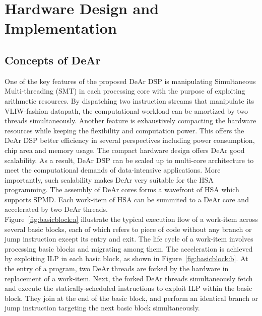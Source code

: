 \chapter{Hardware Design and Implementation}
\section{Concepts of DeAr}
\indent 
One of the key features of the proposed DeAr DSP is manipulating Simultaneous Multi-threading (SMT) in each processing core with the purpose of exploiting arithmetic resources.
By dispatching two instruction streams that manipulate its VLIW-fashion datapath, the computational workload can be amortized by two threads simultaneously.
Another feature is exhaustively compacting the hardware resources while keeping the flexibility and computation power.
This offers the DeAr DSP better efficiency in several perspectives including power consumption, chip area and memory usage.
The compact hardware design offers DeAr good scalability.
As a result, DeAr DSP can be scaled up to multi-core architecture to meet the computational demands of data-intensive applications.
More importantly, such scalability makes DeAr very suitable for the HSA programming.
The assembly of DeAr cores forms a wavefront of HSA which supports SPMD.
Each work-item of HSA can be summited to a DeAr core and accelerated by two DeAr threads.
\\\indent Figure~\ref{fig:basicblock:a} illustrate the typical execution flow of a work-item across several basic blocks, 
each of which refers to piece of code without any branch or jump instruction except its entry and exit.
The life cycle of a work-item involves processing basic blocks and migrating among them.
The acceleration is achieved by exploiting ILP in each basic block, as shown in Figure~\ref{fig:basicblock:b}. 
At the entry of a program, two DeAr threads are forked by the hardware in replacement of a work-item.
Next, the forked DeAr threads simultaneously fetch and execute the statically-scheduled instructions to exploit ILP within the basic block.
They join at the end of the basic block, and perform an identical branch or jump instruction targeting the next basic block simultaneously.
